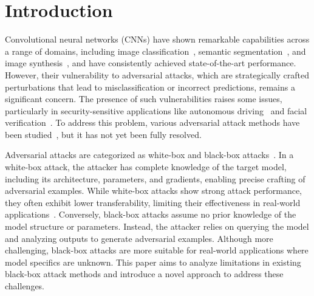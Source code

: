 
\section{Introduction}
\label{sec:intro}

Convolutional neural networks (CNNs) have shown remarkable capabilities across a range of domains, including image classification~\cite{he2016deep, simonyan2014very, huang2017densely, szegedy2015going}, semantic segmentation~\cite{chen2017rethinking, chen2018encoder, zhao2017pyramid, long2015fully}, and image synthesis~\cite{park2024novel, goodfellow2020generative, park2024rethinking, rombach2022high, sagong2022conditional}, and have consistently achieved state-of-the-art performance. However, their vulnerability to adversarial attacks, which are strategically crafted perturbations that lead to misclassification or incorrect predictions, remains a significant concern. The presence of such vulnerabilities raises some issues, particularly in security-sensitive applications like autonomous driving~\cite{eykholt2018robust} and facial verification~\cite{sharif2016accessorize}. To address this problem, various adversarial attack methods have been studied~\cite{wang2024boosting, liang2023styless, xiaosen2023rethinking, chen2023adaptive, zhang2023improving, gu2022segpgd, li2020yet, mkadry2017towards, dong2019evading, lin2019nesterov, xie2019improving, dong2018boosting, guo2020backpropagating, huang2019enhancing, wang2021feature, zhang2022improving}, but it has not yet been fully resolved.


Adversarial attacks are categorized as white-box and black-box attacks~\cite{wang2024boosting, xiaosen2023rethinking}. In a white-box attack, the attacker has complete knowledge of the target model, including its architecture, parameters, and gradients, enabling precise crafting of adversarial examples. While white-box attacks show strong attack performance, they often exhibit lower transferability, limiting their effectiveness in real-world applications~\cite{wang2024boosting, dong2019evading, xie2019improving, guo2020backpropagating}. Conversely, black-box attacks assume no prior knowledge of the model structure or parameters. Instead, the attacker relies on querying the model and analyzing outputs to generate adversarial examples. Although more challenging, black-box attacks are more suitable for real-world applications where model specifics are unknown. This paper aims to analyze limitations in existing black-box attack methods and introduce a novel approach to address these challenges.

